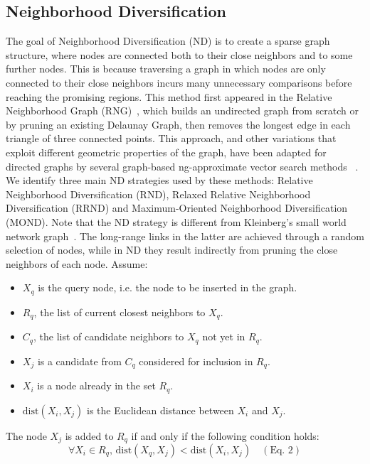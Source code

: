 \subsection{Neighborhood Diversification}
\label{sec:nd}
 The goal of Neighborhood Diversification (ND) is to create a sparse graph structure, where nodes are connected both to their close neighbors and to some further nodes. This is because traversing a graph in which nodes are only connected to their close neighbors incurs many unnecessary comparisons before reaching the promising regions. This method first appeared in the Relative Neighborhood Graph (RNG)~\citep{rng,toussaint02}, which builds an undirected graph from scratch or by pruning an existing Delaunay Graph, then removes the longest edge in each triangle of three connected points.
 This approach, and other variations that exploit different geometric properties of the graph, have been adapted for directed graphs by several graph-based ng-approximate vector search methods ~\citep{hnsw,dpg,nsg,nssg,vamana,SPTAG4,elpis}. We identify three main ND strategies used by these methods: Relative Neighborhood Diversification (RND), Relaxed Relative Neighborhood Diversification (RRND) and Maximum-Oriented Neighborhood Diversification (MOND).
Note that the ND strategy is different from Kleinberg's small world network graph~\cite{kleinberg2000, kleinberg2002}. The long-range links in the latter are achieved through a random selection of nodes, while in ND they result indirectly from pruning the close neighbors of each node.
Assume: %

\begin{itemize}
  \setlength\itemindent{1em}  %
  \item \(X_q\) is the query node, i.e. the node to be inserted in the graph.
  \item \(R_q\), the list of current closest neighbors to \(X_q\).
  \item \(C_q\), the list of candidate neighbors to \(X_q\) not yet in \(R_q\).
  \item \(X_j\) is a candidate from \(C_q\) considered for inclusion in \(R_q\).
  \item \(X_i\) is a node already in the set \(R_q\).
  \item \(\text{dist} \left(X_i, X_j\right)\) is the Euclidean distance between \(X_i\) and \(X_j\).
\end{itemize}
\begin{defn}[RND]\label{def:rnd}
The node \(X_j\) is added to \(R_q\) if and only if the following condition holds:
	\[
	\forall X_i \in R_q, \, \text{dist}\left(X_q, X_j\right) < \text{dist}\left(X_i, X_j\right) \quad (\text{Eq. 2})
	\]
\end{defn}

